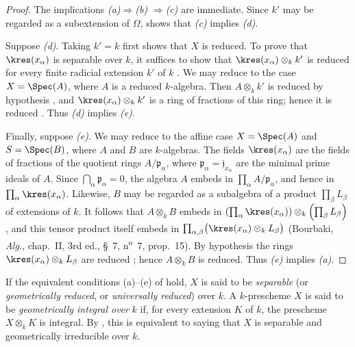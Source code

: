 \begin{proof}
The implications \emph{(a)}$\Rightarrow$\emph{(b)}
$\Rightarrow$\emph{(c)} are immediate.
Since $k'$ may be regarded as a subextension of $\Omega$,
 shows that \emph{(c)} implies \emph{(d)}.

Suppose \emph{(d)}.
Taking $k'=k$ first shows that $X$ is reduced.
To prove that $\kres(x_\alpha)$ is separable over $k$, it suffices to
show that $\kres(x_\alpha)\otimes_k k'$ is reduced for every finite
radicial extension $k'$ of $k$ .
We may reduce to the case $X=\Spec(A)$, where $A$ is a reduced
$k$-algebra.
Then $A\otimes_k k'$ is reduced by hypothesis , and
$\kres(x_\alpha)\otimes_k k'$ is a ring of fractions of this ring;
hence it is reduced .
Thus \emph{(d)} implies \emph{(e)}.

Finally, suppose \emph{(e)}.
We may reduce to the affine case
$X=\Spec(A)$ and $S=\Spec(B)$, where $A$ and $B$ are $k$-algebras.
The fields $\kres(x_\alpha)$ are the fields of fractions of the
quotient rings $A/\mathfrak p_\alpha$, where
$\mathfrak p_\alpha=\mathfrak j_{x_\alpha}$ are the minimal prime
ideals of $A$.
Since $\bigcap_\alpha\mathfrak p_\alpha=0$, the algebra $A$ embeds in
$\prod_\alpha A/\mathfrak p_\alpha$, and hence in
$\prod_\alpha\kres(x_\alpha)$.
Likewise, $B$ may be regarded as a subalgebra of a product
$\prod_\beta L_\beta$ of extensions of $k$.
It follows that $A\otimes_k B$ embeds in $\left(\prod_\alpha\kres(x_\alpha)\right)
\otimes_k
\left(\prod_\beta L_\beta\right)$,
and this tensor product itself embeds in $\prod_{\alpha,\beta}
\bigl(\kres(x_\alpha)\otimes_k L_\beta\bigr)$
(Bourbaki, \emph{Alg.}, chap.~II, 3rd ed., \S~7,
n\textsuperscript{o}~7, prop.~15).
By hypothesis the rings
$\kres(x_\alpha)\otimes_k L_\beta$ are reduced
; hence $A\otimes_k B$ is reduced.
Thus \emph{(e)} implies \emph{(a)}.
\end{proof}

\begin{definition}[4.6.2]
\label{IV.4.6.2}
If the equivalent conditions \textup{(a)}--\textup{(e)} of
 hold, $X$ is said to be \emph{separable}
(or \emph{geometrically reduced}, or \emph{universally reduced}) over
$k$.
A $k$-prescheme $X$ is said to be \emph{geometrically integral over}
$k$ if, for every extension $K$ of $k$, the prescheme
$X\otimes_k K$ is integral.
By , this is equivalent to saying that $X$ is separable
and geometrically irreducible over $k$.
\end{definition}

